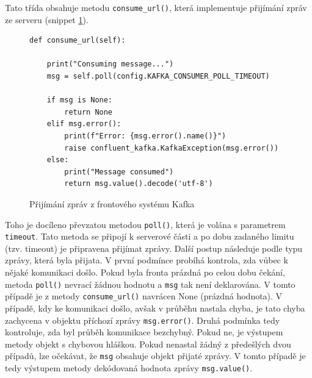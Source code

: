 \documentclass[thesis=M,czech,hidelinks]{FITthesis}[2013/05/06]
\begin{document}
Tato třída obsahuje metodu \texttt{consume_url()}, která implementuje přijímání zpráv ze serveru (snippet \ref{snip:kafkapoll}).
\begin{figure}[h]               
	\begin{verbatim}
def consume_url(self):
	
    print("Consuming message...")
    msg = self.poll(config.KAFKA_CONSUMER_POLL_TIMEOUT)
	
    if msg is None:
        return None
    elif msg.error():
        print(f"Error: {msg.error().name()}")
        raise confluent_kafka.KafkaException(msg.error())
    else:
        print("Message consumed")
        return msg.value().decode('utf-8')
	\end{verbatim}      
	\caption{Přijímání zpráv z frontového systému Kafka}
	\label{snip:kafkapoll}
\end{figure}
Toho je docíleno převzatou metodou \texttt{poll()}, která je volána s parametrem \texttt{timeout}. Tato metoda se připojí k serverové části a po dobu zadaného limitu (tzv. timeout) je připravena přijímat zprávy. Další postup následuje podle typu zprávy, která byla přijata. V první podmínce probíhá kontrola, zda vůbec k nějaké komunikaci došlo. Pokud byla fronta prázdná po celou dobu čekání, metoda \texttt{poll()} nevrací žádnou hodnotu a \texttt{msg} tak není deklarována. V tomto případě je z metody \texttt{consume_url()} navrácen None (prázdná hodnota). V případě, kdy ke komunikaci došlo, avšak v průběhu nastala chyba, je tato chyba zachycena v objektu příchozí zprávy \texttt{msg.error()}. Druhá podmínka tedy kontroluje, zda byl průběh komunikace bezchybný. Pokud ne, je výstupem metody objekt s chybovou hláškou. Pokud nenastal žádný z předešlých dvou případů, lze očekávat, že \texttt{msg} obsahuje objekt přijaté zprávy. V tomto případě je tedy výstupem metody dekódovaná hodnota zprávy \texttt{msg.value()}. 
\end{document}
